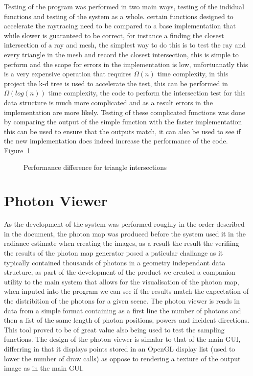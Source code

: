 Testing of the program was performed in two main ways, testing of the indidual functions and testing of the system as a whole.
certain functions designed to accelerate the raytracing need to be compared to a base implementation that while slower is
guaranteed to be correct, for instance a finding the closest intersection of a ray and mesh, the simplest way to do this
is to test the ray and every triangle in the mesh and record the closest intersection, this is simple to perform and
the scope for errors in the implementation is low, unfortuanatly this is a very expensive operation that requires $\Omega(n)$
time complexity, in this project the k-d tree is used to accelerate the test, this can be performed in $\Omega(log(n))$ time
complexity, the code to perform the intersection test for this data structure is much more complicated and as a result
errors in the implementation are more likely. Testing of these complicated functions was done by comparing the output
of the simple function with the faster implementation this can be used to ensure that the outputs match, it can also be
used to see if the new implementation does indeed increase the performance of the code. Figure~\ref{fig:testing_performance_comp}

\begin{figure}[h!]
\label{fig:testing_performance_comp}
\caption{Performance difference for triangle intersections}
\end{figure}

\section{Photon Viewer}
As the development of the system was performed roughly in the order described in the document, the photon map was produced before the
system used it in the radiance estimate when creating the images, as a result the result the verifiing the results of the photon
map generator posed a paticular challange as it typically contained thousands of photons in a geometry independant data structure, as
part of the development of the product we created a companion utility to the main system that allows for the visualisation of the
photon map, when inputed into the program we can see if the results match the expectation of the distribition of the photons for a
given scene. The photon viewer is reads in data from a simple format containing as a first line the number of photons and then
a list of the same length of photon positions, powers and incident directions. This tool proved to be of great value also being used
to test the sampling functions. The design of the photon viewer is simalar to that of the main GUI, differring in that it displays points
stored in an OpenGL display list \cite{khronos:2014:online}  (used to lower the number of draw calls) as oppose to rendering a
texture of the output image as in the main GUI.

